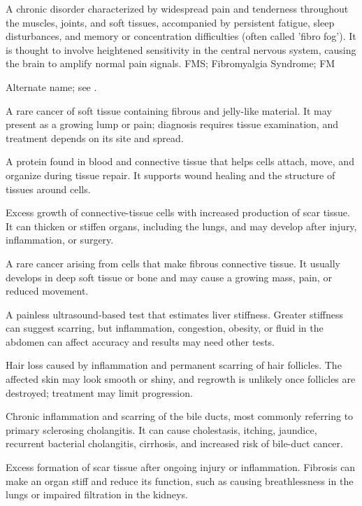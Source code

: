  A chronic disorder characterized by widespread pain and tenderness throughout the muscles, joints, and soft tissues, accompanied by persistent fatigue, sleep disturbances, and memory or concentration difficulties (often called 'fibro fog'). It is thought to involve heightened sensitivity in the central nervous system, causing the brain to amplify normal pain signals.
\synonyms
FMS; Fibromyalgia Syndrome; FM

 Alternate name; see .

 A rare cancer of soft tissue containing fibrous and jelly-like material. It may present as a growing lump or pain; diagnosis requires tissue examination, and treatment depends on its site and spread.

 A protein found in blood and connective tissue that helps cells attach, move, and organize during tissue repair. It supports wound healing and the structure of tissues around cells.

 Excess growth of connective-tissue cells with increased production of scar tissue. It can thicken or stiffen organs, including the lungs, and may develop after injury, inflammation, or surgery.

 A rare cancer arising from cells that make fibrous connective tissue. It usually develops in deep soft tissue or bone and may cause a growing mass, pain, or reduced movement.

 A painless ultrasound-based test that estimates liver stiffness. Greater stiffness can suggest scarring, but inflammation, congestion, obesity, or fluid in the abdomen can affect accuracy and results may need other tests.

 Hair loss caused by inflammation and permanent scarring of hair follicles. The affected skin may look smooth or shiny, and regrowth is unlikely once follicles are destroyed; treatment may limit progression.

 Chronic inflammation and scarring of the bile ducts, most commonly referring to primary sclerosing cholangitis. It can cause cholestasis, itching, jaundice, recurrent bacterial cholangitis, cirrhosis, and increased risk of bile-duct cancer.

 Excess formation of scar tissue after ongoing injury or inflammation. Fibrosis can make an organ stiff and reduce its function, such as causing breathlessness in the lungs or impaired filtration in the kidneys.


